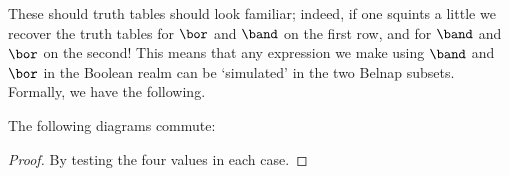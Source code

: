 These should truth tables should look familiar; indeed, if one squints a little
we recover the truth tables for \(\bor\) and \(\band\) on the first row, and for
\(\band\) and \(\bor\) on the second!
This means that any expression we make using \(\band\) and \(\bor\) in the
Boolean realm can be `simulated' in the two Belnap subsets.
Formally, we have the following.

\begin{lemma}\label{lem:belnap-bool-correspondence}
    The following diagrams commute:
    \begin{center}
        \quad

        \hspace{0.3em}
        \quad
    \end{center}
\end{lemma}
\begin{proof}
    By testing the four values in each case.
\end{proof}

